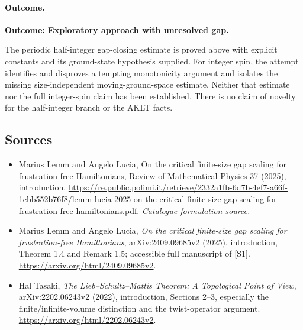 \documentclass[11pt,a4paper]{article}
\numberwithin{equation}{section}
\begin{document}
\paragraph{Outcome.}
\textbf{Outcome: Exploratory approach with unresolved gap.}

The periodic half-integer gap-closing estimate is proved above with explicit
constants and its ground-state hypothesis supplied. For integer spin, the
attempt identifies and disproves a tempting monotonicity argument and
isolates the missing size-independent moving-ground-space estimate.
Neither that estimate nor the full integer-spin claim has been established.
There is no claim of novelty for the half-integer branch or the AKLT facts.
\subsection{Sources}
\begin{itemize}\raggedright
\item[\textnormal{[S1]}]\hypertarget{source:111:1}{} Marius Lemm and Angelo Lucia, On the critical finite-size gap scaling for frustration-free Hamiltonians, Review of Mathematical Physics 37 (2025), introduction.
\url{https://re.public.polimi.it/retrieve/2332a1fb-6d7b-4ef7-a66f-1cbb552b76f8/lemm-lucia-2025-on-the-critical-finite-size-gap-scaling-for-frustration-free-hamiltonians.pdf}.
{\small\textit{Catalogue formulation source.}}
\item[\textnormal{[E1]}]\hypertarget{extra:111:1}{} Marius Lemm and Angelo Lucia,
\emph{On the critical finite-size gap scaling for frustration-free Hamiltonians},
arXiv:2409.09685v2 (2025), introduction, Theorem 1.4 and Remark 1.5;
accessible full manuscript of [S1].
\url{https://arxiv.org/html/2409.09685v2}.
\item[\textnormal{[E2]}]\hypertarget{extra:111:2}{} Hal Tasaki,
\emph{The Lieb--Schultz--Mattis Theorem: A Topological Point of View},
arXiv:2202.06243v2 (2022), introduction, Sections 2--3, especially the
finite/infinite-volume distinction and the twist-operator argument.
\url{https://arxiv.org/html/2202.06243v2}.
\end{itemize}
\end{document}
